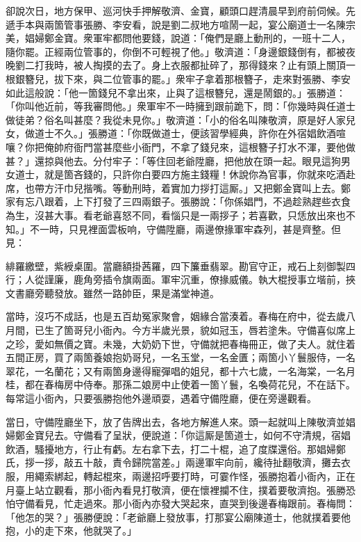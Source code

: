 卻說次日，地方保甲、巡河快手押解敬濟、金寶，顧頭口趕清晨早到府前伺候。先遞手本與兩箇管事張勝、李安看，說是劉二叔地方喧鬧一起，宴公廟道士一名陳宗美，娼婦鄭金寶。衆軍牢都問他要錢，說道：「俺們是廳上動刑的，一班十二人，隨你罷。正經兩位管事的，你倒不可輕視了他。」敬濟道：「身邊銀錢倒有，都被夜晚劉二打我時，被人掏摸的去了。身上衣服都扯碎了，那得錢來？止有頭上關頂一根銀簪兒，拔下來，與二位管事的罷。」{}衆牢子拿着那根簪子，走來對張勝、李安如此這般說：「他一箇錢兒不拿出來，止與了這根簪兒，還是鬧銀的。」張勝道：「你叫他近前，等我審問他。」衆軍牢不一時擁到跟前跪下，問：「你幾時與任道士做徒弟？俗名叫甚麼？我從未見你。」敬濟道：「小的俗名叫陳敬濟，原是好人家兒女，做道士不久。」張勝道：「你既做道士，便該習學經典，許你在外宿娼飲酒喧嚷？你把俺帥府衙門當甚麼些小衙門，不拿了錢兒來，這根簪子打水不渾，要他做甚？」還掠與他去。分付牢子：「等住回老爺陞廳，把他放在頭一起。眼見這狗男女道士，就是箇吝錢的，只許你白要四方施主錢糧！休說你為官事，你就來吃酒赴席，也帶方汗巾兒揩嘴。等動刑時，着實加力拶打這厮。」又把鄭金寶叫上去。鄭家有忘八跟着，上下打發了三四兩銀子。張勝說：「你係娼門，不過趁熟趕些衣食為生，沒甚大事。看老爺喜怒不同，看惱只是一兩拶子；若喜歡，只恁放出來也不知。」不一時，只見裡面雲板响，守備陞廳，兩邊僚掾軍牢森列，甚是齊整。但見：

\begin{myquote}
緋羅繳壁，紫綬桌圍。當廳額掛茜羅，四下簾垂翡翠。勘官守正，戒石上刻御製四行；人從謹廉，鹿角旁插令旗兩面。軍牢沉重，僚掾威儀。執大棍授事立堦前，挾文書廳旁聽發放。雖然一路帥臣，果是滿堂神道。
\end{myquote}

當時，沒巧不成話，也是五百劫冤家聚會，姻緣合當湊着。春梅在府中，從去歲八月間，已生了箇哥兒小衙內。{}今方半歲光景，貌如冠玉，唇若塗朱。守備喜似席上之珍，愛如無價之寶。未幾，大奶奶下世，守備就把春梅冊正，做了夫人。{}就住着五間正房，買了兩箇養娘抱奶哥兒，一名玉堂，一名金匱；兩箇小丫鬟服侍，一名翠花，一名蘭花；又有兩箇身邊得寵彈唱的姐兒，都十六七歲，一名海棠，一名月桂，都在春梅房中侍奉。那孫二娘房中止使着一箇丫鬟，名喚荷花兒，不在話下。每常這小衙內，只要張勝抱他外邊頑耍，遇着守備陞廳，便在旁邊觀看。

當日，守備陞廳坐下，放了告牌出去，各地方解進人來。頭一起就叫上陳敬濟並娼婦鄭金寶兒去。守備看了呈狀，便說道：「你這厮是箇道士，如何不守清規，宿娼飲酒，騷擾地方，行止有虧。左右拿下去，打二十棍，追了度牒還俗。{}那娼婦鄭氏，拶一拶，敲五十敲，責令歸院當差。」兩邊軍牢向前，纔待扯翻敬濟，攤去衣服，用繩索綁起，轉起棍來，兩邊招呼要打時，可霎作怪，張勝抱着小衙內，正在月臺上站立觀看，那小衙內看見打敬濟，便在懷裡攔不住，撲着要敬濟抱。張勝恐怕守備看見，忙走過來。那小衙內亦發大哭起來，直哭到後邊春梅跟前。春梅問：「他怎的哭？」張勝便說：「老爺廳上發放事，打那宴公廟陳道士，他就撲着要他抱，小的走下來，他就哭了。」


